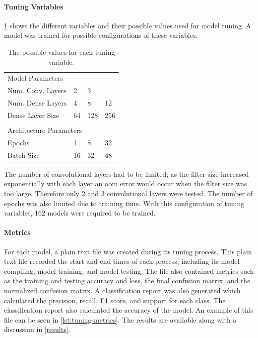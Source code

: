 \documentclass[12pt]{article}
\begin{document}
\paragraph{Tuning Variables}\label{variables}

\ref{tab:variables} shows the different variables and their possible values used for model tuning. A model was trained for possible configurations of these variables.

\begin{table}[H]
\centering
\begin{tabular}{llll}
\multicolumn{4}{l}{Model Parameters}        \\
Num. Conv. Layers    & 2     & 3     &      \\
Num. Dense Layers    & 4     & 8     & 12   \\
Dense Layer Size     & 64    & 128   & 256  \\ 
& & & \\
\multicolumn{4}{l}{Architecture Parameters} \\
Epochs               & 1     & 8     & 32   \\
Batch Size           & 16    & 32    & 48  
\end{tabular}
\caption{The possible values for each tuning variable.}
\label{tab:variables}
\end{table}

The number of convolutional layers had to be limited; as the filter size increased exponentially with each layer an \acrfull{oom} error would occur when the filter size was too large. Therefore only 2 and 3 convolutional layers were tested. The number of epochs was also limited due to training time. With this configuration of tuning variables, 162 models were required to be trained.

\paragraph{Metrics}

For each model, a plain text file was created during its tuning process. This plain text file recorded the start and end times of each process, including its model compiling, model training, and model testing. The file also contained metrics such as the training and testing accuracy and loss, the final confusion matrix, and the normalized confusion matrix. A classification report was also generated which calculated the precision, recall, F1 score, and support for each class. The classification report also calculated the accuracy of the model. An example of this file can be seen in \ref{lst:tuning-metrics}. The results are available along with a discussion in \ref{results}.
\end{document}
